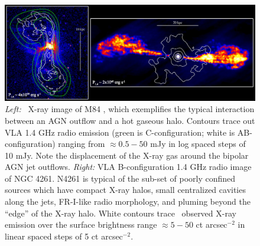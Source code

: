 \begin{figure}[ht]
  \begin{center}
    \begin{minipage}[ht]{\linewidth}
      \includegraphics*[width=\textwidth, trim=0mm 0mm 0mm 0mm, clip]{composite2.eps}
      \caption{{\it{Left:}} \chandra\ X-ray image of M84 \citep[NGC
          4374;][]{2001ApJ...547L.107F, 2008ApJ...686..911F}, which
        exemplifies the typical interaction between an AGN outflow and
        a hot gaseous halo. Contours trace out VLA 1.4 GHz radio
        emission (green is C-configuration; white is AB-configuration)
        ranging from $\approx 0.5-50$ mJy in log spaced steps of 10
        mJy. Note the displacement of the X-ray gas around the bipolar
        AGN jet outflows. {\it{Right:}} VLA B-configuration 1.4 GHz
        radio image of NGC 4261. N4261 is typical of the sub-set of
        poorly confined sources which have compact X-ray halos, small
        centralized cavities along the jets, FR-I-like radio
        morphology, and pluming beyond the ``edge'' of the X-ray
        halo. White contours trace \chandra\ observed X-ray emission
        over the surface brightness range $\approx 5-50$ ct
        arcsec$^{-2}$ in linear spaced steps of 5 ct arcsec$^{-2}$.}
      \label{fig:pics}
    \end{minipage}
  \end{center}
\end{figure}
